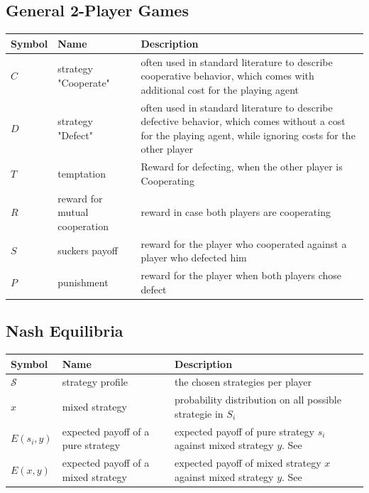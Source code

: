 \documentclass[a4paper,12pt]{scrartcl}
\begin{document}
\subsection{General 2-Player Games}

\begin{tabular}{C{0.1\textwidth}p{0.3\textwidth}p{0.6\textwidth}}
	\toprule
	Symbol & Name &  Description \\
	\midrule
	$C$ & strategy "Cooperate" & often used in standard literature to describe cooperative behavior, which comes with additional cost for the playing agent \\
	$D$ & strategy "Defect" & often used in standard literature to describe defective behavior, which comes without a cost for the playing agent, while ignoring costs for the other player\\[2em]
	$T$ & temptation & Reward for defecting, when the other player is Cooperating\\
	$R$ & reward for mutual \newline cooperation & reward in case both players are cooperating\\
	$S$ & suckers payoff & reward for the player who cooperated against a player who defected him\\
	$P$ & punishment & reward for the player when both players chose defect\\
	\bottomrule
\end{tabular}


\subsection{Nash Equilibria}

\begin{tabular}{C{0.1\textwidth}p{0.3\textwidth}p{0.6\textwidth}}
	\toprule
	Symbol & Name &  Description \\
	\midrule
	$\mathcal{S}$ & strategy profile & the chosen strategies per player\\
	$x$ & mixed strategy & probability distribution on all possible strategie in $S_i$ \\
	$E(s_i,y)$ & expected payoff of a \newline pure strategy & expected payoff of pure strategy $s_i$ against mixed strategy $y$. See \\
	$E(x,y)$ & expected payoff of a \newline mixed strategy & expected payoff of mixed strategy $x$ against mixed strategy $y$. See \\
	\bottomrule
\end{tabular}
\end{document}
